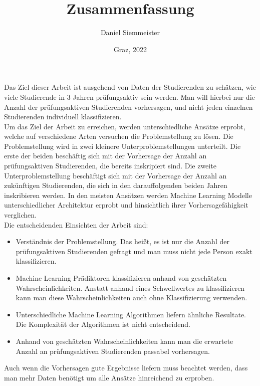 \documentclass[a4paper, german, 11pt]{article}
\title{Zusammenfassung}
\author{Daniel Siemmeister}
\date{Graz, 2022}
\begin{document}
\maketitle
\thispagestyle{empty}

Das Ziel dieser Arbeit ist ausgehend von Daten der Studierenden zu sch\"atzen, wie viele
Studierende in 3 Jahren pr\"ufungsaktiv sein werden. Man will hierbei nur die Anzahl der pr\"ufungsaktiven Studierenden vorhersagen,
und nicht jeden einzelnen Studierenden individuell klassifizieren.\\

Um das Ziel der Arbeit zu erreichen, werden unterschiedliche Ans\"atze erprobt, welche auf verschiedene Arten versuchen die Problemstellung zu l\"osen.
Die Problemstellung wird in zwei kleinere Unterproblemstellungen unterteilt. Die erste der beiden besch\"aftig sich mit der Vorhersage der Anzahl an pr\"ufungsaktiven Studierenden,
die bereits inskripiert sind. Die zweite Unterproblemstellung besch\"aftigt sich mit der Vorhersage der Anzahl an zuk\"unftigen Studierenden, die sich in den darauffolgenden beiden Jahren inskribieren werden.
In den meisten Ans\"atzen werden Machine Learning Modelle unterschiedlicher Architektur erprobt und hinsichtlich ihrer Vorhersagef\"ahigkeit
verglichen.\\

Die entscheidenden Einsichten der Arbeit sind:
\begin{itemize}
    \item Verst\"andnis der Problemstellung. Das hei{\ss}t, es ist nur die Anzahl der pr\"ufungsaktiven Studierenden gefragt und man muss nicht jede Person exakt klassifizieren.
    \item Machine Learning Pr\"adiktoren klassifizieren anhand von gesch\"atzten Wahrscheinlichkeiten. Anstatt anhand eines Schwellwertes zu klassifizieren
          kann man diese Wahrscheinlichkeiten auch ohne Klassifizierung verwenden.
    \item Unterschiedliche Machine Learning Algorithmen liefern \"ahnliche Resultate. Die Komplexit\"at der Algorithmen ist nicht entscheidend.
    \item Anhand von gesch\"atzten Wahrscheinlichkeiten kann man die erwartete Anzahl an pr\"ufungsaktiven Studierenden passabel vorhersagen.
\end{itemize}

Auch wenn die Vorhersagen gute Ergebnisse liefern muss beachtet werden, dass man mehr Daten ben\"otigt um alle Ans\"atze hinreichend zu erproben.
\end{document}
